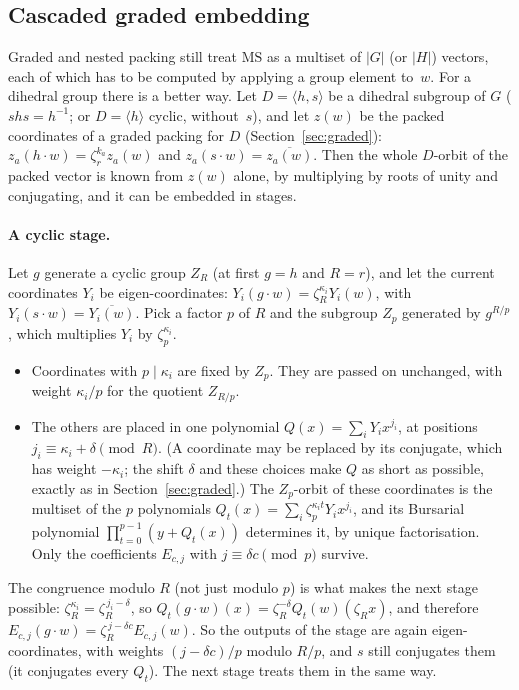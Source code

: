 \documentclass[11pt]{article}
\theoremstyle{definition}
\theoremstyle{remark}
\newcommand{\MS}{\mathrm{MS}}
\begin{document}
\subsection{Cascaded graded embedding}\label{sec:cascade}

Graded and nested packing still treat $\MS$ as a multiset of $|G|$ (or $|H|$)
vectors, each of which has to be computed by applying a group element to~$w$.
For a dihedral group there is a better way. Let $D = \langle h, s\rangle$ be a
dihedral subgroup of $G$ ($s h s = h^{-1}$; or $D = \langle h\rangle$ cyclic,
without~$s$), and let $z(w)$ be the packed coordinates of a graded packing for
$D$ (Section~\ref{sec:graded}): $z_a(h\cdot w) = \zeta_r^{k_a} z_a(w)$ and
$z_a(s\cdot w) = \overline{z_a(w)}$. Then the whole $D$-orbit of the packed
vector is known from $z(w)$ alone, by multiplying by roots of unity and
conjugating, and it can be embedded in stages.

\paragraph{A cyclic stage.}
Let $g$ generate a cyclic group $Z_R$ (at first $g = h$ and $R = r$), and let
the current coordinates $Y_i$ be eigen-coordinates: $Y_i(g\cdot w) =
\zeta_R^{\kappa_i} Y_i(w)$, with $Y_i(s\cdot w) = \overline{Y_i(w)}$. Pick a
factor $p$ of $R$ and the subgroup $Z_p$ generated by $g^{R/p}$, which
multiplies $Y_i$ by $\zeta_p^{\kappa_i}$.
\begin{itemize}
  \item Coordinates with $p \mid \kappa_i$ are fixed by $Z_p$. They are passed
    on unchanged, with weight $\kappa_i/p$ for the quotient $Z_{R/p}$.
  \item The others are placed in one polynomial $Q(x) = \sum_i Y_i x^{j_i}$, at
    positions $j_i \equiv \kappa_i + \delta \pmod R$. (A coordinate may be
    replaced by its conjugate, which has weight $-\kappa_i$; the shift $\delta$
    and these choices make $Q$ as short as possible, exactly as in
    Section~\ref{sec:graded}.) The $Z_p$-orbit of these coordinates is the
    multiset of the $p$ polynomials $Q_t(x) = \sum_i \zeta_p^{\kappa_i t} Y_i
    x^{j_i}$, and its Bursarial polynomial $\prod_{t=0}^{p-1} (y + Q_t(x))$
    determines it, by unique factorisation. Only the coefficients $E_{c,j}$
    with $j \equiv \delta c \pmod p$ survive.
\end{itemize}
The congruence modulo $R$ (not just modulo $p$) is what makes the next stage
possible: $\zeta_R^{\kappa_i} = \zeta_R^{\,j_i - \delta}$, so
$Q_t(g\cdot w)(x) = \zeta_R^{-\delta} Q_t(w)(\zeta_R x)$, and therefore
$E_{c,j}(g\cdot w) = \zeta_R^{\,j - \delta c} E_{c,j}(w)$. So the outputs of the
stage are again eigen-coordinates, with weights $(j - \delta c)/p$ modulo $R/p$,
and $s$ still conjugates them (it conjugates every $Q_t$). The next stage
treats them in the same way.
\end{document}
